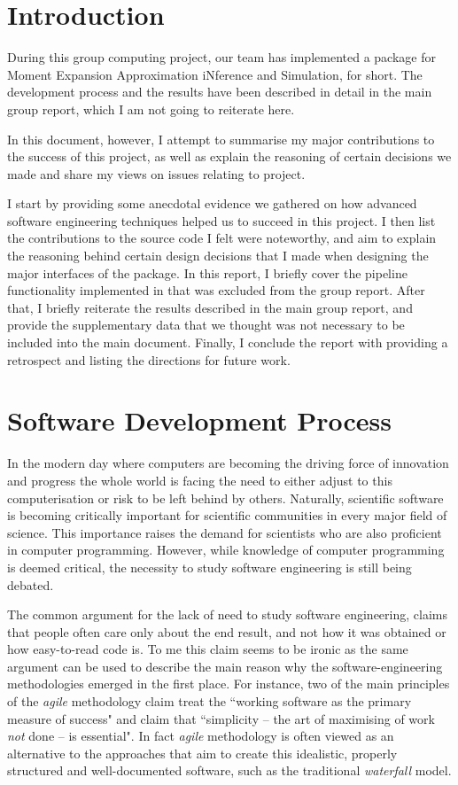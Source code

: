 \section{Introduction}

During this group computing project, our team has implemented a \py{} package for Moment Expansion Approximation iNference and Simulation, \means{} for short. 
The development process and the results have been described in detail in the main group report, which I am not going to reiterate here.

In this document, however, I attempt to summarise my major contributions to the success of this project, as well as explain the reasoning of certain decisions we made and share my views on issues relating to \means{} project.

I start by providing some anecdotal evidence we gathered on how advanced software engineering techniques helped us to succeed in this project. 
I then list the contributions to the source code I felt were noteworthy, and aim to explain the reasoning behind certain design decisions that I made when designing the major interfaces of the package. In this report, I briefly cover the pipeline functionality implemented in \means{} that was excluded from the group report.
After that, I briefly reiterate the results described in the main group report, and provide the supplementary data that we thought was not necessary to be included into the main document. 
Finally, I conclude the report with providing a retrospect and listing the directions for future work.

\section{Software Development Process}

In the modern day where computers are becoming the driving force of innovation and progress the whole world is facing the need to either adjust to this computerisation or risk to be left behind by others.
Naturally, scientific software is becoming critically important for scientific communities in every major field of science. This importance raises the demand for scientists who are also proficient in computer programming. However, while knowledge of computer programming is deemed critical, the necessity to study software engineering is still being debated. 

The common argument for the lack of need to study software engineering, claims that people often care only about the end result, and not how it was obtained or how easy-to-read code is.
To me this claim seems to be ironic as the same argument can be used to describe the main reason why the software-engineering methodologies emerged in the first place. 
For instance, two of the main principles of the \emph{agile} methodology\cite{_manifesto_????} claim treat the ``working software as the primary measure of success" and claim that ``simplicity -- the art of maximising of work \emph{not} done -- is essential"\cite{paulk_agile_2002}. 
In fact \emph{agile} methodology is often viewed as an alternative to the approaches that aim to create this idealistic, properly structured and well-documented software, such as the traditional \emph{waterfall} model.

